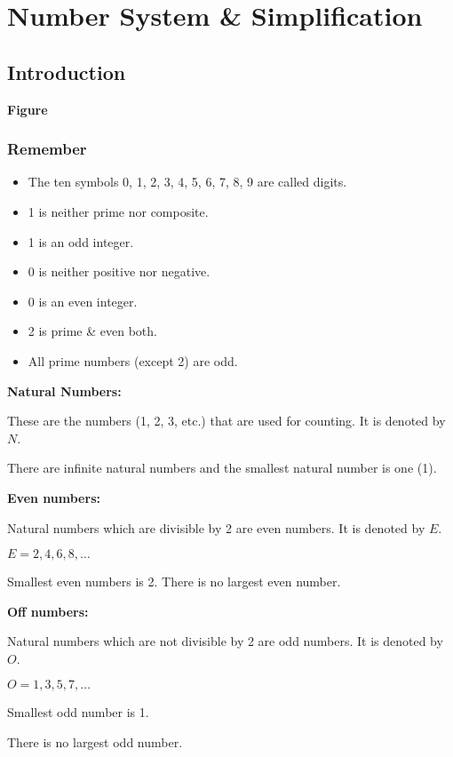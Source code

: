 \chapter{Number System \& Simplification}

\section*{Introduction}
\begin{center}
{\bf Figure}
\end{center}

\begin{multicols}{2}

\subsection*{Remember}
\begin{itemize}
\item The ten symbols 0, 1, 2, 3, 4, 5, 6, 7, 8, 9 are called digits.
\item 1 is neither prime nor composite.
\item 1 is an odd integer.
\item 0 is neither positive nor negative.
\item 0 is an even integer.
\item 2 is prime \& even both.
\item All prime numbers (except 2) are odd.
\end{itemize}

\textbf{Natural Numbers:}

These are the numbers (1, 2, 3, etc.) that are used for counting. It is denoted by $N$.

There are infinite natural numbers and the smallest natural number is one (1).

\textbf{Even numbers:}

Natural numbers which are divisible by 2 are even numbers. It is denoted by $E$.

$E = 2, 4, 6, 8, \ldots$

Smallest even numbers is 2. There is no largest even number.

\textbf{Off numbers:}

Natural numbers which are not divisible by 2 are odd numbers. It is denoted by $O$.

$O = 1, 3, 5, 7, \ldots$

Smallest odd number is 1.

There is no largest odd number.


\end{multicols}
